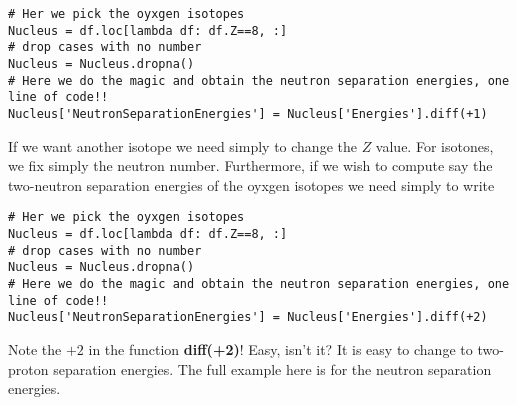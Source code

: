 \documentclass[%
oneside,                 %
final,                   %
10pt]{article}
\newenvironment{doconceexercise}{}{}
\begin{document}
\begin{doconceexercise}
\begin{verbatim}
# Her we pick the oyxgen isotopes
Nucleus = df.loc[lambda df: df.Z==8, :]
# drop cases with no number
Nucleus = Nucleus.dropna()
# Here we do the magic and obtain the neutron separation energies, one line of code!!
Nucleus['NeutronSeparationEnergies'] = Nucleus['Energies'].diff(+1)

\end{verbatim}


If we want another isotope we need simply to change the $Z$ value. For isotones, we fix simply the neutron number. Furthermore, if we wish to compute say the two-neutron separation energies of the oyxgen isotopes we need simply to write 







\begin{verbatim}
# Her we pick the oyxgen isotopes
Nucleus = df.loc[lambda df: df.Z==8, :]
# drop cases with no number
Nucleus = Nucleus.dropna()
# Here we do the magic and obtain the neutron separation energies, one line of code!!
Nucleus['NeutronSeparationEnergies'] = Nucleus['Energies'].diff(+2)

\end{verbatim}

Note the $+2$ in the function \textbf{diff(+2)}!  Easy, isn't it? It is easy to change to two-proton separation energies. The full example here is for the neutron separation energies.






































































\end{doconceexercise}
\end{document}
